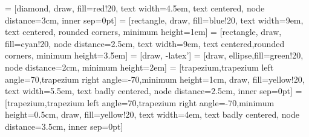  = [diamond, draw, fill=red!20, 
    text width=4.5em, text centered, node distance=3cm, inner sep=0pt]
 = [rectangle, draw, fill=blue!20, 
    text width=9em, text centered, rounded corners, minimum height=1em]
 = [rectangle, draw, fill=cyan!20, node distance=2.5cm,
    text width=9em, text centered,rounded corners, minimum height=3.5em]
 = [draw, -latex']
 = [draw, ellipse,fill=green!20, node distance=2cm,
    minimum height=2em]
     = [trapezium,trapezium left angle=70,trapezium right angle=-70,minimum height=1cm, draw, fill=yellow!20, text width=5.5em, text badly centered, node distance=2.5cm, inner sep=0pt]
     = [trapezium,trapezium left angle=70,trapezium right angle=-70,minimum height=0.5cm, draw, fill=yellow!20, text width=4em, text badly centered, node distance=3.5cm, inner sep=0pt]
    
